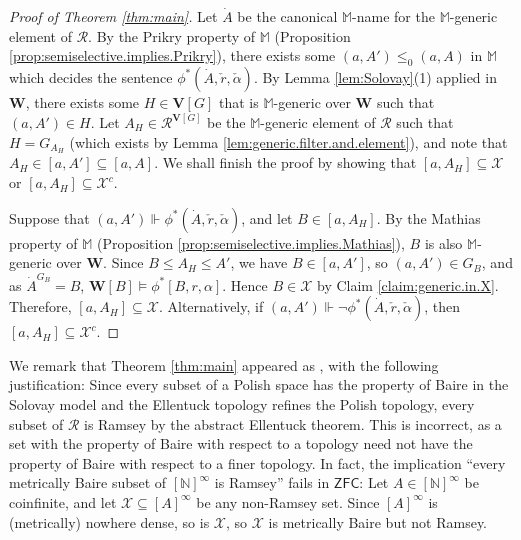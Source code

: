 \documentclass[10pt,a4paper]{amsart}
\theoremstyle{plain}
\numberwithin{equation}{section}
\theoremstyle{definition}
\newcommand{\N}{\mathbb{N}}
\newcommand{\cal}{\mathcal}
\renewcommand{\bf}{\mathbf}
\newcommand{\ZFC}{\mathsf{ZFC}}
\newcommand{\forces}{\Vdash}
\newcommand{\V}{\bf{V}}
\newcommand{\W}{\bf{W}}
\newcommand{\X}{\cal{X}}
\begin{document}
\begin{proof}[Proof of Theorem \ref{thm:main}]
    Let $\dot{A}$ be the canonical $\mathbb{M}$-name for the $\mathbb{M}$-generic element of $\cal{R}$. By the Prikry property of $\mathbb{M}$ (Proposition \ref{prop:semiselective.implies.Prikry}), there exists some $(a,A') \leq_0 (a,A)$ in $\mathbb{M}$ which decides the sentence $\phi^*(\dot{A},\check{r},\check{\alpha})$. By Lemma \ref{lem:Solovay}(1) applied in $\W$, there exists some $H \in \V[G]$ that is $\mathbb{M}$-generic over $\W$ such that $(a,A') \in H$. Let $A_H \in \cal{R}^{\V[G]}$ be the $\mathbb{M}$-generic element of $\cal{R}$ such that $H = G_{A_H}$ (which exists by Lemma \ref{lem:generic.filter.and.element}), and note that $A_H \in [a,A'] \subseteq [a,A]$. We shall finish the proof by showing that $[a,A_H] \subseteq \X$ or $[a,A_H] \subseteq \X^c$. 

    Suppose that $(a,A') \forces \phi^*(\dot{A},\check{r},\check{\alpha})$, and let $B \in [a,A_H]$. By the Mathias property of $\mathbb{M}$ (Proposition \ref{prop:semiselective.implies.Mathias}), $B$ is also $\mathbb{M}$-generic over $\W$. Since $B \leq A_H \leq A'$, we have $B \in [a,A']$, so $(a,A') \in G_B$, and as $\dot{A}^{G_B} = B$, $\W[B] \models \phi^*[B,r,\alpha]$. Hence $B \in \X$ by Claim \ref{claim:generic.in.X}. Therefore, $[a,A_H] \subseteq \X$. Alternatively, if $(a,A') \forces \neg\phi^*(\dot{A},\check{r},\check{\alpha})$, then $[a,A_H] \subseteq \X^c$.
\end{proof}


We remark that Theorem \ref{thm:main} appeared as \cite[Theorem 6.1]{Y24}, with the following justification: Since every subset of a Polish space has the property of Baire in the Solovay model and the Ellentuck topology refines the Polish topology, every subset of $\cal{R}$ is Ramsey by the abstract Ellentuck theorem. This is incorrect, as a set with the property of Baire with respect to a topology need not have the property of Baire with respect to a finer topology. In fact, the implication ``every metrically Baire subset of $[\N]^\infty$ is Ramsey'' fails in $\ZFC$: Let $A \in [\N]^\infty$ be coinfinite, and let $\X \subseteq [A]^\infty$ be any non-Ramsey set. Since $[A]^\infty$ is (metrically) nowhere dense, so is $\X$, so $\X$ is metrically Baire but not Ramsey.




\end{document}
